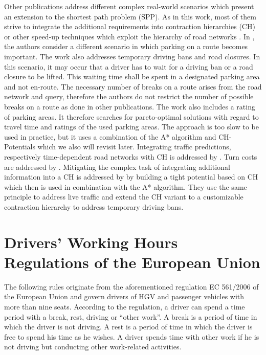 Other publications address different complex real-world scenarios which present an extension to the shortest path problem (SPP). As in this work, most of them strive to integrate the additional requirements into contraction hierarchies (CH) or other speed-up techniques which exploit the hierarchy of road networks \cite{bast:2015}. In \cite{kleff:2020b}, the authors consider a different scenario in which parking on a route becomes important. The work also addresses temporary driving bans and road closures. In this scenario, it may occur that a driver has to wait for a driving ban or a road closure to be lifted. This waiting time shall be spent in a designated parking area and not en-route. The necessary number of breaks on a route arises from the road network and query, therefore the authors do not restrict the number of possible breaks on a route as done in other publications. The work also includes a rating of parking areas. It therefore searches for pareto-optimal solutions with regard to travel time and ratings of the used parking areas. The approach is too slow to be used in practice, but it uses a combination of the A* algorithm and CH-Potentials which we also will revisit later. Integrating traffic predictions, respectively time-dependent road networks with CH is addressed by \cite{batz:2009,batz:2013}. Turn costs are addressed by \cite{geisberger:2011}. Mitigating the complex task of integrating additional information into a CH is addressed by \cite{strasser:2021b} by building a tight potential based on CH which then is used in combination with the A* algorithm. They use the same principle to address live traffic and extend the CH variant to a customizable contraction hierarchy \cite{dibbelt:2016} to address temporary driving bans.


\section{Drivers' Working Hours Regulations of the European Union\label{sec:dwh_eu}}
The following rules originate from the aforementioned regulation EC 561/2006 of the European Union \cite{europeanparliament:2006} and govern drivers of HGV and passenger vehicles with more than nine seats. According to the regulation, a driver can spend a time period with a break, rest, driving or ``other work''. A break is a period of time in which the driver is not driving. A rest is a period of time in which the driver is free to spend his time as he wishes. A driver spends time with other work if he is not driving but conducting other work-related activities.

